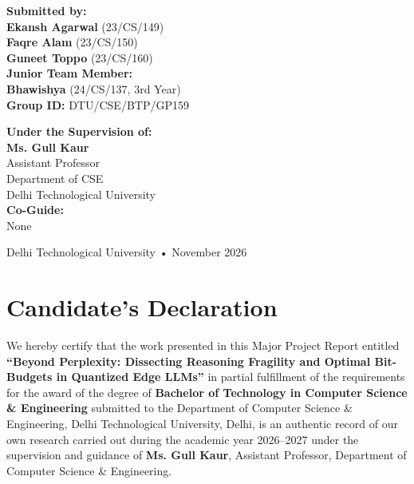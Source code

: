 \documentclass[12pt,a4paper,oneside]{report}
\begin{document}
\begin{titlepage}
\begin{center}
    \begin{minipage}{0.48\textwidth}
        \begin{flushleft} \large
            \textbf{Submitted by:}\\[0.2cm]
            \textbf{Ekansh Agarwal} (23/CS/149)\\
            \textbf{Faqre Alam} (23/CS/150)\\
            \textbf{Guneet Toppo} (23/CS/160)\\[0.2cm]
            \textbf{Junior Team Member:}\\
            \textbf{Bhawishya} (24/CS/137, 3rd Year)\\[0.2cm]
            \textbf{Group ID:} DTU/CSE/BTP/GP159
        \end{flushleft}
    \end{minipage}
    \hfill
    \begin{minipage}{0.48\textwidth}
        \begin{flushright} \large
            \textbf{Under the Supervision of:}\\[0.2cm]
            \textbf{Ms. Gull Kaur}\\
            Assistant Professor\\
            Department of CSE\\
            Delhi Technological University\\[0.6cm]
            \textbf{Co-Guide:}\\
            None
        \end{flushright}
    \end{minipage}

    \vfill
    {\large Delhi Technological University • November 2026}
\end{center}
\end{titlepage}

\chapter*{Candidate's Declaration}

We hereby certify that the work presented in this Major Project Report entitled \textbf{``Beyond Perplexity: Dissecting Reasoning Fragility and Optimal Bit-Budgets in Quantized Edge LLMs''} in partial fulfillment of the requirements for the award of the degree of \textbf{Bachelor of Technology in Computer Science \& Engineering} submitted to the Department of Computer Science \& Engineering, Delhi Technological University, Delhi, is an authentic record of our own research carried out during the academic year 2026--2027 under the supervision and guidance of \textbf{Ms. Gull Kaur}, Assistant Professor, Department of Computer Science \& Engineering.
\end{document}
